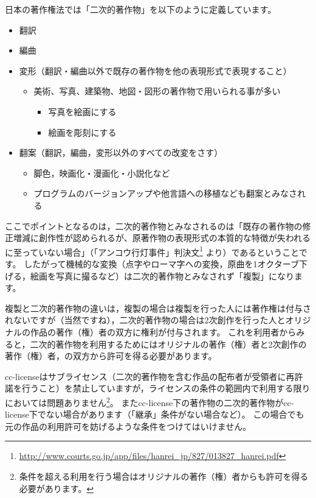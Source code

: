 \documentclass{ltjsarticle}
\begin{document}
日本の著作権法では「二次的著作物」を以下のように定義しています。
\begin{itemize}
\item 翻訳
\item 編曲
\item 変形（翻訳・編曲以外で既存の著作物を他の表現形式で表現すること）
      \begin{itemize}
      \item 美術、写真、建築物、地図・図形の著作物で用いられる事が多い
            \begin{itemize}
            \item 写真を絵画にする
            \item 絵画を彫刻にする
            \end{itemize}
      \end{itemize}
\item 翻案（翻訳，編曲，変形以外のすべての改変をさす）
      \begin{itemize}
      \item 脚色，映画化・漫画化・小説化など
      \item プログラムのバージョンアップや他言語への移植なども翻案とみなされる
      \end{itemize}
\end{itemize}
ここでポイントとなるのは，二次的著作物とみなされるのは「既存の著作物の修正増減に創作性が認められるが、原著作物の表現形式の本質的な特徴が失われるに至っていない場合」（「アンコウ行灯事件」判決文\footnote{\url{http://www.courts.go.jp/app/files/hanrei_jp/827/013827_hanrei.pdf}} より）であるということです。
したがって機械的な変換（点字やローマ字への変換，原曲を1オクターブ下げる，絵画を写真に撮るなど）は二次的著作物とみなされず「複製」になります。

複製と二次的著作物の違いは，複製の場合は複製を行った人には著作権は付与されないですが（当然ですね），二次的著作物の場合は2次創作を行った人とオリジナルの作品の著作（権）者の双方に権利が付与されます。
これを利用者からみると，二次的著作物を利用するためにはオリジナルの著作（権）者と2次創作の著作（権）者，の双方から許可を得る必要があります。

cc-licenseはサブライセンス（二次的著作物を含む作品の配布者が受領者に再許諾を行うこと）を禁止していますが，ライセンスの条件の範囲内で利用する限りにおいては問題ありません\footnote{条件を超える利用を行う場合はオリジナルの著作（権）者からも許可を得る必要があります。}。
またcc-license下の著作物の二次的著作物がcc-license下でない場合があります（「継承」条件がない場合など）。
この場合でも元の作品の利用許可を妨げるような条件をつけてはいけません。
\end{document}
